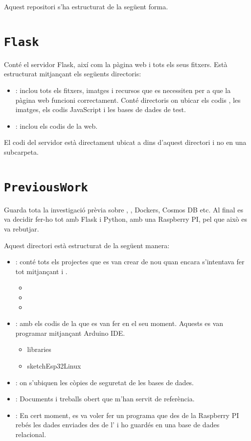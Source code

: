 \documentclass{tfgitic}[2022/06/30]
\begin{document}
Aquest repositori s'ha estructurat de la següent forma.

\section{\texttt{Flask}}
Conté el servidor Flask, així com la pàgina web i tots els seus fitxers. Està estructurat mitjançant els següents directoris:

\begin{itemize}
    \item {}: inclou tots els fitxers, imatges i recursos que es necessiten per a que la pàgina web funcioni correctament. Conté directoris on ubicar els codis , les imatges, els codis JavaScript i les bases de dades de test.
    \item {}: inclou els codis  de la web.
\end{itemize}

El codi del servidor està directament ubicat a dins d'aquest directori i no en una subcarpeta.

\section{\texttt{PreviousWork}}
Guarda tota la investigació prèvia sobre , , Dockers, Cosmos DB etc. Al final es va decidir fer-ho tot amb Flask i Python, amb una Raspberry PI, pel que això es va rebutjar.

Aquest directori està estructurat de la següent manera:

\begin{itemize}
    \item {}: conté tots els projectes que es van crear de nou quan encara s'intentava fer tot mitjançant  i .
        \begin{itemize}
            \item {}
            \item {}
            \item {}
        \end{itemize}
    \item {}: amb els codis de la  que es van fer en el seu moment. Aquests es van programar mitjançant Arduino IDE.
        \begin{itemize}
            \item libraries
            \item sketchEsp32Linux
        \end{itemize}
    \item {}: on s'ubiquen les còpies de seguretat de les bases de dades.
    \item {}: Documents i treballs obert que m'han servit de referència.
    \item {}: En cert moment, es va voler fer un programa que des de la Raspberry PI rebés les dades enviades des de l' i ho guardés en una base de dades relacional.
\end{itemize}
\end{document}
